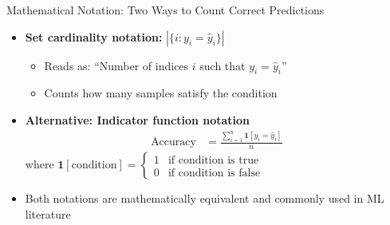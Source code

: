 \documentclass[usenames,dvipsnames]{beamer}
\begin{document}
\begin{frame}{Mathematical Notation: Two Ways to Count Correct Predictions}
\begin{itemize}
	\item \pause \textbf{Set cardinality notation:} $|\{i : y_i = \hat{y}_i\}|$ 
	\begin{itemize}
		\item Reads as: ``Number of indices $i$ such that $y_i = \hat{y}_i$''
		\item Counts how many samples satisfy the condition
	\end{itemize}
	
	\item \pause \textbf{Alternative: Indicator function notation}
	\begin{align*}
	\text{Accuracy} &= \frac{\sum_{i=1}^n \mathbf{1}[y_i = \hat{y}_i]}{n}
	\end{align*}
	where $\mathbf{1}[\text{condition}] = \begin{cases} 1 & \text{if condition is true} \\ 0 & \text{if condition is false} \end{cases}$
	
	\item \pause Both notations are mathematically equivalent and commonly used in ML literature
\end{itemize}

\end{frame}
\end{document}

